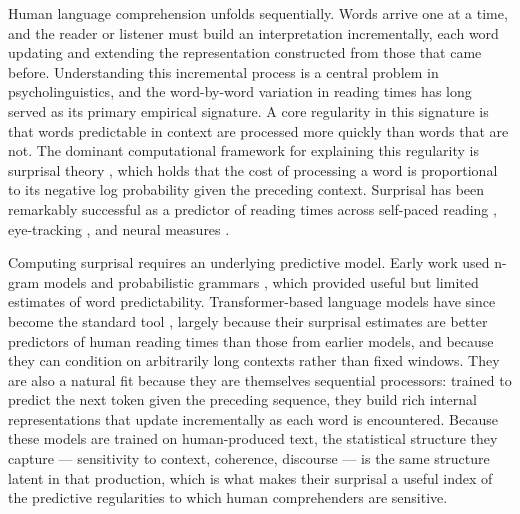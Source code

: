 \documentclass[12pt]{article}
\begin{document}
Human language comprehension unfolds sequentially. Words arrive one at a time, and the reader or listener must build an interpretation incrementally, each word updating and extending the representation constructed from those that came before. Understanding this incremental process is a central problem in psycholinguistics, and the word-by-word variation in reading times has long served as its primary empirical signature. A core regularity in this signature is that words predictable in context are processed more quickly than words that are not. The dominant computational framework for explaining this regularity is surprisal theory \citep{hale2001,levy2008}, which holds that the cost of processing a word is proportional to its negative log probability given the preceding context. %
Surprisal has been remarkably successful as a predictor of reading times across self-paced reading \citep{smith2013}, eye-tracking \citep{demberg2008}, and neural measures \citep{frank2015}.

Computing surprisal requires an underlying predictive model. Early work used n-gram models and probabilistic grammars \citep{hale2001,demberg2008,roark2009}, which provided useful but limited estimates of word predictability. Transformer-based language models have since become the standard tool \citep{goodkind2018,wilcox2020,schrimpf2021}, largely because their surprisal estimates are better predictors of human reading times than those from earlier models, and because they can condition on arbitrarily long contexts rather than fixed windows. They are also a natural fit because they are themselves sequential processors: trained to predict the next token given the preceding sequence, they build rich internal representations that update incrementally as each word is encountered. Because these models are trained on human-produced text, the statistical structure they capture --- sensitivity to context, coherence, discourse --- is the same structure latent in that production, which is what makes their surprisal a useful index of the predictive regularities to which human comprehenders are sensitive.
\end{document}
